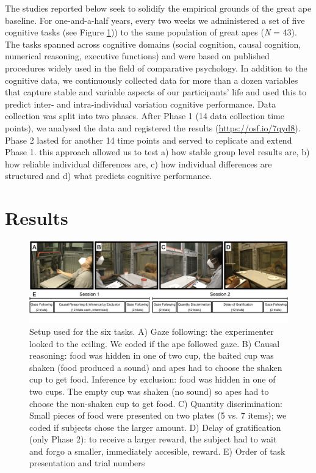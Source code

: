 \documentclass[
  man,floatsintext]{apa6}
\begin{document}
The studies reported below seek to solidify the empirical grounds of the great ape baseline. For one-and-a-half years, every two weeks we administered a set of five cognitive tasks (see Figure \ref{fig:setup})) to the same population of great apes (\emph{N} = 43). The tasks spanned across cognitive domains (social cognition, causal cognition, numerical reasoning, executive functions) and were based on published procedures widely used in the field of comparative psychology. In addition to the cognitive data, we continuously collected data for more than a dozen variables that capture stable and variable aspects of our participants' life and used this to predict inter- and intra-individual variation cognitive performance. Data collection was split into two phases. After Phase 1 (14 data collection time points), we analysed the data and registered the results (\url{https://osf.io/7qyd8}). Phase 2 lasted for another 14 time points and served to replicate and extend Phase 1. this approach allowed us to test a) how stable group level results are, b) how reliable individual differences are, c) how individual differences are structured and d) what predicts cognitive performance.

\hypertarget{results}{%
\section{Results}\label{results}}

\begin{figure}
\includegraphics[width=1\linewidth]{./figures/setup} \caption{Setup used for the six tasks. A) Gaze following: the experimenter looked to the ceiling. We coded if the ape followed gaze. B) Causal reasoning: food was hidden in one of two cup, the baited cup was shaken (food produced a sound) and apes had to choose the shaken cup to get food. Inference by exclusion: food was hidden in one of two cups. The empty cup was shaken (no sound) so apes had to choose the non-shaken cup to get food. C) Quantity discrimination: Small pieces of food were presented on two plates (5 vs. 7 items); we coded if subjects chose the larger amount. D) Delay of gratification (only Phase 2): to receive a larger reward, the subject had to wait and forgo a smaller, immediately accesible, reward. E) Order of task presentation and trial numbers}\label{fig:setup}
\end{figure}
\end{document}

